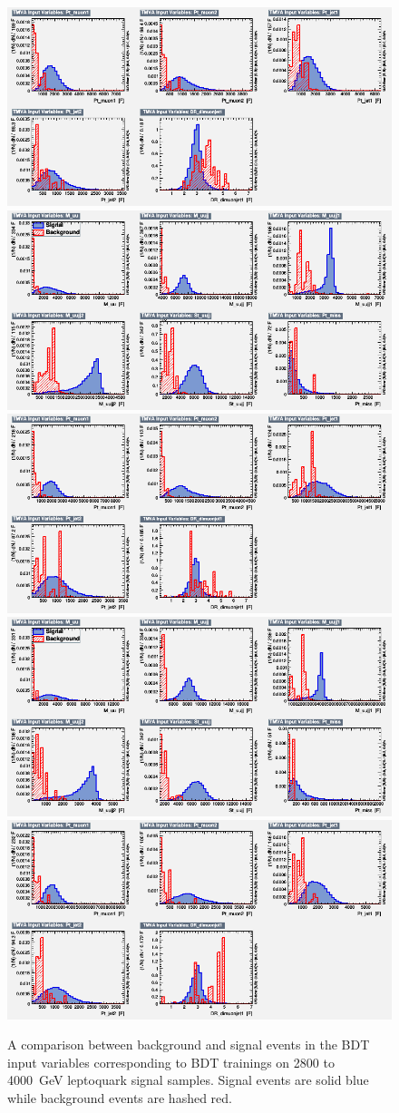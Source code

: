 \begin{figure}[H]
    {\includegraphics[width=.49\textwidth]{Images/Analysis/Results_LQToBMu_pair_uubj_BDTG_FullRun2_2023_01_25_020318/3000/variables_id_c2.png}}
    {\includegraphics[width=.49\textwidth]{Images/Analysis/Results_LQToBMu_pair_uubj_BDTG_FullRun2_2023_01_25_020318/3500/variables_id_c1.png}}
    {\includegraphics[width=.49\textwidth]{Images/Analysis/Results_LQToBMu_pair_uubj_BDTG_FullRun2_2023_01_25_020318/3500/variables_id_c2.png}}
    {\includegraphics[width=.49\textwidth]{Images/Analysis/Results_LQToBMu_pair_uubj_BDTG_FullRun2_2023_01_25_020318/4000/variables_id_c1.png}}
    {\includegraphics[width=.49\textwidth]{Images/Analysis/Results_LQToBMu_pair_uubj_BDTG_FullRun2_2023_01_25_020318/4000/variables_id_c2.png}}
    \caption{A comparison between background and signal events in the BDT input variables corresponding to BDT trainings on 2800 to \SI{4000}{GeV} leptoquark signal samples. Signal events are solid blue while background events are hashed red.}
    \label{figapp:variables6}
\end{figure}

